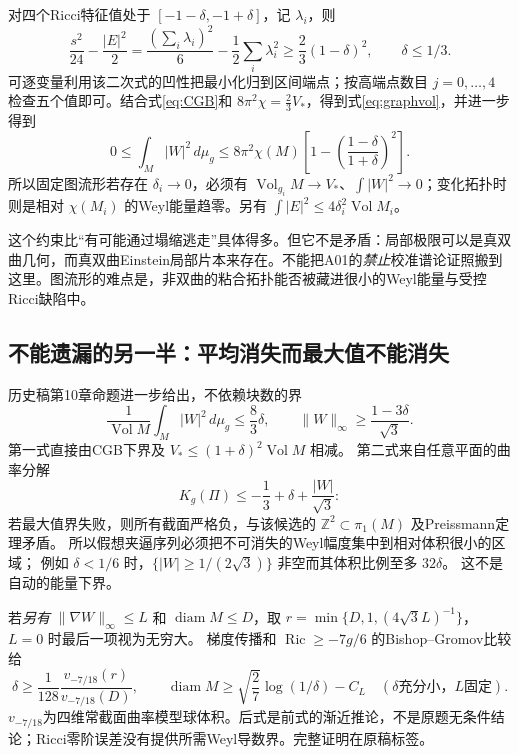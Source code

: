 \documentclass[UTF8,a4paper,11pt,fontset=fandol]{ctexart}
\numberwithin{equation}{section}
\theoremstyle{definition}
\newcommand{\Ric}{\operatorname{Ric}}
\newcommand{\Vol}{\operatorname{Vol}}
\newcommand{\diam}{\operatorname{diam}}
\newcommand{\dd}{\,d\mu_g}
\begin{document}
对四个Ricci特征值处于 $[-1-\delta,-1+\delta]$，记 $\lambda_i$，则
\[
\frac{s^2}{24}-\frac{|E|^2}{2}
=\frac{(\sum_i\lambda_i)^2}{6}-\frac12\sum_i\lambda_i^2
\ge\frac23(1-\delta)^2,\qquad\delta\le1/3.
\]
可逐变量利用该二次式的凹性把最小化归到区间端点；按高端点数目 $j=0,\dots,4$ 检查五个值即可。结合式\eqref{eq:CGB}和 $8\pi^2\chi=\frac23V_*$，得到式\eqref{eq:graphvol}，并进一步得到
\begin{equation}\label{eq:graphW}
\boxed{0\le\int_M|W|^2\dd\le8\pi^2\chi(M)
\left[1-\left(\frac{1-\delta}{1+\delta}\right)^2\right].}
\end{equation}
所以固定图流形若存在 $\delta_i\to0$，必须有 $\Vol_{g_i}M\to V_*$、$\int|W|^2\to0$；变化拓扑时则是相对 $\chi(M_i)$ 的Weyl能量趋零。另有 $\int|E|^2\le4\delta_i^2\Vol M_i$。

这个约束比“有可能通过塌缩逃走”具体得多。但它不是矛盾：局部极限可以是真双曲几何，而真双曲Einstein局部片本来存在。不能把A01的\emph{禁止}校准谱论证照搬到这里。图流形的难点是，非双曲的粘合拓扑能否被藏进很小的Weyl能量与受控Ricci缺陷中。

\subsection{不能遗漏的另一半：平均消失而最大值不能消失}
历史稿第10章命题进一步给出，不依赖块数的界
\begin{equation}\label{eq:graphconcentration}
 \frac1{\Vol M}\int_M|W|^2\dd\le\frac83\delta,
 \qquad \|W\|_\infty\ge\frac{1-3\delta}{\sqrt3}.
\end{equation}
第一式直接由CGB下界及 $V_*\le(1+\delta)^2\Vol M$ 相减。
第二式来自任意平面的曲率分解
\[
 K_g(\Pi)\le-\frac13+\delta+\frac{|W|}{\sqrt3}:
\]
若最大值界失败，则所有截面严格负，与该候选的
$\mathbb Z^2\subset\pi_1(M)$ 及Preissmann定理矛盾。
所以假想夹逼序列必须把不可消失的Weyl幅度集中到相对体积很小的区域；
例如 $\delta<1/6$ 时，$\{|W|\ge1/(2\sqrt3)\}$ 非空而其体积比例至多 $32\delta$。
这不是自动的能量下界。

若\emph{另有} $\|\nabla W\|_\infty\le L$ 和 $\diam M\le D$，取
$r=\min\{D,1,(4\sqrt3L)^{-1}\}$，$L=0$ 时最后一项视为无穷大。
梯度传播和 $\Ric\ge-7g/6$ 的Bishop--Gromov比较给
\begin{equation}\label{eq:graphdiameter}
 \delta\ge\frac1{128}\frac{v_{-7/18}(r)}{v_{-7/18}(D)},
 \qquad \diam M\ge\sqrt{\frac27}\log(1/\delta)-C_L
 \quad(\delta\text{充分小，}L\text{固定}).
\end{equation}
$v_{-7/18}$为四维常截面曲率模型球体积。后式是前式的渐近推论，不是原题无条件结论；Ricci零阶误差没有提供所需Weyl导数界。完整证明在原稿标签。
\end{document}
